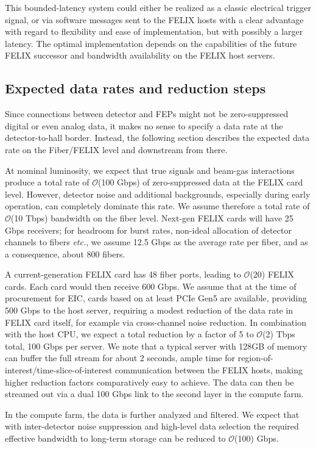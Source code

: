 This bounded-latency system could either be realized as a classic electrical trigger signal, or via software messages sent to the FELIX hosts with a clear advantage with regard to flexibility and ease of implementation, but with possibly a larger latency. The optimal implementation depends on the capabilities of the future FELIX successor and bandwidth availability on the FELIX host servers.

\subsection{Expected data rates and reduction steps}


Since connections between detector and FEPs might not be zero-suppressed digital or even analog data, it makes no sense to specify a data rate at the detector-to-hall border. Instead, the following section describes the expected data rate on the Fiber/FELIX level and downstream from there.

At nominal luminosity, we expect that true signals and beam-gas interactions produce a total rate of $\mathcal{O}$(100 Gbps) of zero-suppressed data at the FELIX card level. However, detector noise and additional backgrounds, especially during early operation, can completely dominate this rate. We assume therefore a total rate of $\mathcal{O}$(10 Tbps) bandwidth on the fiber level. Next-gen FELIX cards will have 25 Gbps receivers; for headroom for burst rates, non-ideal allocation of detector channels to fibers \emph{etc.}, we assume 12.5 Gbps as the average rate per fiber, and as a consequence, about 800 fibers.

A current-generation FELIX card has 48 fiber ports, leading to $\mathcal{O}$(20) FELIX cards. Each card would then receive 600 Gbps. We assume that at the time of procurement for EIC, cards based on at least PCIe Gen5 are available, providing 500 Gbps to the host server, requiring a modest reduction of the data rate in FELIX card itself, for example via cross-channel noise reduction. In combination with the host CPU, we expect a total reduction by a factor of 5 to $\mathcal{O}$(2) Tbps total, 100 Gbps per server. We note that a typical server with 128GB of memory can buffer the full stream for about 2 seconds, ample time for region-of-interest/time-slice-of-interest communication between the FELIX hosts, making higher reduction factors comparatively easy to achieve. The data can then be streamed out via a dual 100 Gbps link to the second layer in the compute farm.

In the compute farm, the data is further analyzed and filtered. We expect that with inter-detector noise suppression and high-level data selection the required effective bandwidth to long-term storage can be reduced to $\mathcal{O}$(100) Gbps.  






